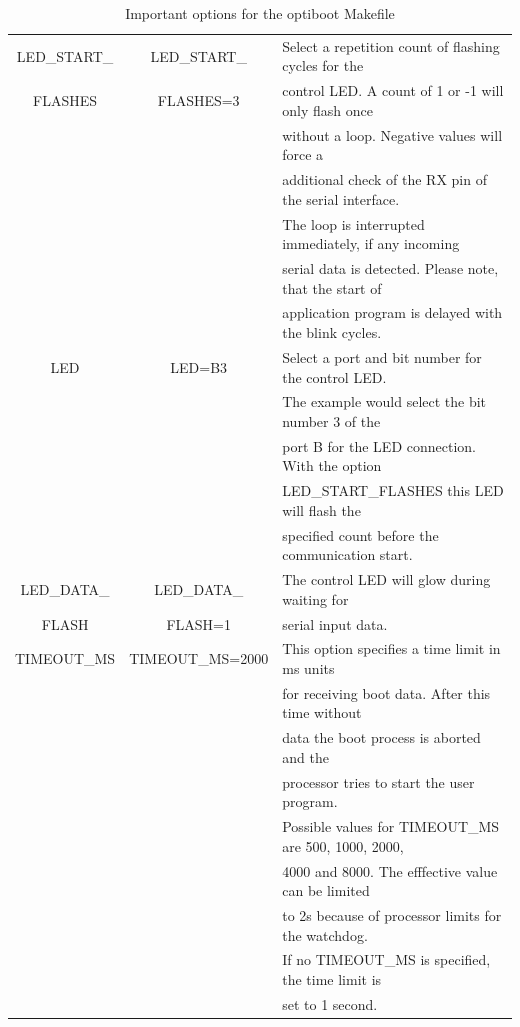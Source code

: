 \begin{table}[H]
\begin{center}
\begin{tabular}{| c | c | l |}
    \hline
 LED\_START\_      & LED\_START\_   & Select a repetition count of flashing cycles for the \\
   FLASHES         &   FLASHES=3    & control LED. A count of 1 or -1 will only flash once \\
                   &                & without a loop. Negative values will force a \\
                   &                & additional check of the RX pin of the serial interface. \\
                   &                & The loop is interrupted immediately, if any incoming \\
                   &                & serial data is detected. Please note, that the start of \\
                   &                & application program is delayed with the blink cycles. \\

    \hline
 LED               & LED=B3         & Select a port and bit number for the control LED. \\
                   &                & The example would select the bit number 3 of the \\
                   &                & port B for the LED connection. With the option \\
                   &                & LED\_START\_FLASHES  this LED will flash the \\
                   &                & specified count before the communication start. \\
    \hline
 LED\_DATA\_       & LED\_DATA\_    & The control LED will glow during waiting for \\
      FLASH        &    FLASH=1     & serial input data. \\
    \hline
 TIMEOUT\_MS       & TIMEOUT\_MS=2000 & This option specifies a time limit in ms units \\
                   &                  & for receiving boot data. After this time without \\
                   &                  & data the boot process is aborted and the \\
                   &                  & processor tries to start the user program. \\
                   &                  & Possible values for TIMEOUT\_MS are 500, 1000, 2000, \\
                   &                  & 4000 and 8000. The efffective value can be limited \\
                   &                  & to 2s because of processor limits for the watchdog. \\
                   &                  & If no TIMEOUT\_MS is specified, the time limit is \\
                   &                  & set to 1 second. \\
    \hline
    \end{tabular}
  \end{center}
  \caption{Important options for the optiboot Makefile}
  \label{tab:options1}
\end{table}

